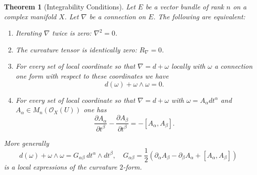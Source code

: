 \documentclass[12pt]{book}
\numberwithin{equation}{section}
\newtheorem{theorem}{Theorem}[subsection]
\theoremstyle{definition}
\theoremstyle{remark}
\newcommand{\Ocal}{\mathcal{O}}
\begin{document}
\begin{theorem}[Integrability Conditions]\label{T:integrability-conditions}
	Let $E$ be a vector bundle of rank $n$ on a complex manifold $X$.
	Let $\nabla$ be a connection on $E$.
	The following are equivalent:
	\begin{enumerate}
		\item \label{I:nabla-squared}Iterating $\nabla$ twice is zero: $\nabla^2=0$.
		\item \label{I:vanishing-curvature} The curvature tensor is identically zero: $R_{\nabla}=0$.
		\item \label{I:connection-one-form} For every set of local coordinate so that $\nabla = d+\omega$ locally with $\omega$ a connection one form with respect to these coordinates we have 
		$$ d(\omega) + \omega \wedge \omega =0.$$
		\item \label{I:potentials} For every set of local coordinate so that $\nabla = d+\omega$ with $\omega = A_{\alpha} dt^{\alpha}$ and $A_{\alpha} \in M_n(\Ocal_X(U))$ one has 
		$$ \dfrac{\partial A_{\alpha}}{\partial t^{\beta}}- \dfrac{\partial A_{\beta}}{\partial t^{\beta}} = -[A_{\alpha},A_{\beta}].$$
	\end{enumerate}
	More generally 
	$$d(\omega) + \omega \wedge \omega= G_{\alpha\beta} \ dt^{\alpha}\wedge dt^{\beta}, \quad G_{\alpha\beta} = \frac{1}{2}\left(  \partial_{\alpha} A_{\beta} - \partial_{\beta} A_{\alpha} + [A_{\alpha},A_{\beta}]\right)$$
	 is a local expressions of the curvature $2$-form.
\end{theorem}
\end{document}
